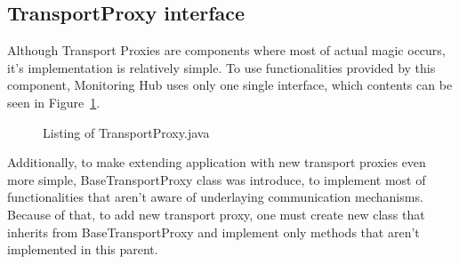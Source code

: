\subsection{TransportProxy interface}
Although Transport Proxies are components where most of actual magic occurs, it\rq{}s implementation is relatively simple. To use functionalities provided by this component, Monitoring Hub uses only one single interface, which contents can be seen in Figure~\ref{fig:transport_proxy}.

\begin{figure}[ht]
  \centering
  
  \caption{Listing of TransportProxy.java}
  \label{fig:transport_proxy}
\end{figure} 

Additionally, to make extending application with new transport proxies even more simple, BaseTransportProxy class was introduce, to implement most of functionalities that aren\rq{}t aware of underlaying communication mechanisms. Because of that, to add new transport proxy, one must create new class that inherits from BaseTransportProxy and implement only methods that aren\rq{}t implemented in this parent.
